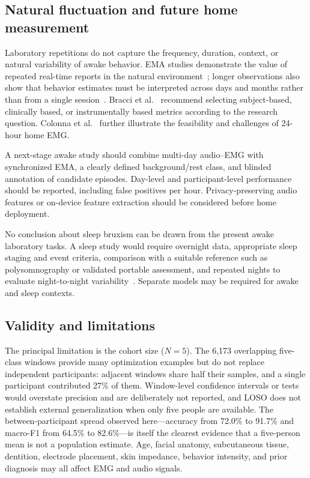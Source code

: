 \documentclass[pdflatex,sn-nature,iicol]{sn-jnl}
\begin{document}
\subsection{Natural fluctuation and future home measurement}

Laboratory repetitions do not capture the frequency, duration, context, or natural variability of awake behavior. EMA studies demonstrate the value of repeated real-time reports in the natural environment~\cite{bracci2018frequency}; longer observations also show that behavior estimates must be interpreted across days and months rather than from a single session~\cite{colonna2025fluctuation}. Bracci et al.~\cite{bracci2024metrics} recommend selecting subject-based, clinically based, or instrumentally based metrics according to the research question. Colonna et al.~\cite{colonna2023electromyographic} further illustrate the feasibility and challenges of 24-hour home EMG.

A next-stage awake study should combine multi-day audio--EMG with synchronized EMA, a clearly defined background/rest class, and blinded annotation of candidate episodes. Day-level and participant-level performance should be reported, including false positives per hour. Privacy-preserving audio features or on-device feature extraction should be considered before home deployment.

No conclusion about sleep bruxism can be drawn from the present awake laboratory tasks. A sleep study would require overnight data, appropriate sleep staging and event criteria, comparison with a suitable reference such as polysomnography or validated portable assessment, and repeated nights to evaluate night-to-night variability~\cite{cidverdejo2024instrumental}. Separate models may be required for awake and sleep contexts.

\subsection{Validity and limitations}

The principal limitation is the cohort size ($N=5$). The 6,173 overlapping five-class windows provide many optimization examples but do not replace independent participants: adjacent windows share half their samples, and a single participant contributed 27\% of them. Window-level confidence intervals or tests would overstate precision and are deliberately not reported, and LOSO does not establish external generalization when only five people are available. The between-participant spread observed here---accuracy from 72.0\% to 91.7\% and macro-F1 from 64.5\% to 82.6\%---is itself the clearest evidence that a five-person mean is not a population estimate. Age, facial anatomy, subcutaneous tissue, dentition, electrode placement, skin impedance, behavior intensity, and prior diagnosis may all affect EMG and audio signals.
\end{document}
